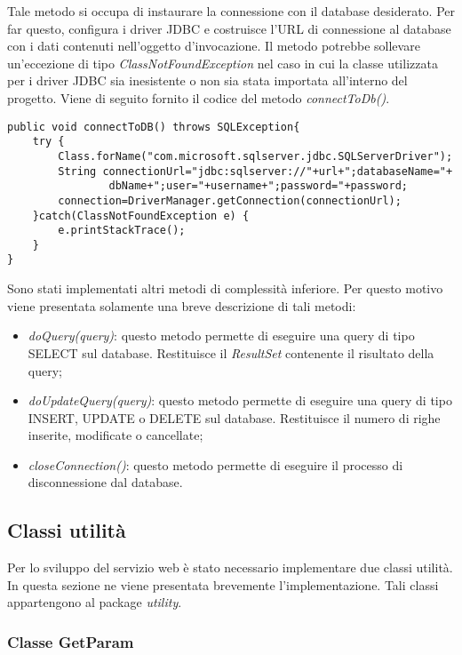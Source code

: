 Tale metodo si occupa di instaurare la connessione con il database desiderato. Per far questo, configura i driver JDBC e costruisce l'URL di connessione al database con i dati contenuti nell'oggetto d'invocazione. Il metodo potrebbe sollevare un'eccezione di tipo \textit{ClassNotFoundException} nel caso in cui la classe utilizzata per i driver JDBC sia inesistente o non sia stata importata all'interno del progetto. Viene di seguito fornito il codice del metodo \textit{connectToDb()}.
\begin{lstlisting}
public void connectToDB() throws SQLException{
	try {
		Class.forName("com.microsoft.sqlserver.jdbc.SQLServerDriver");
		String connectionUrl="jdbc:sqlserver://"+url+";databaseName="+
				dbName+";user="+username+";password="+password;
		connection=DriverManager.getConnection(connectionUrl);
	}catch(ClassNotFoundException e) {
		e.printStackTrace();
	}
}
\end{lstlisting}


Sono stati implementati altri metodi di complessità inferiore. Per questo motivo viene presentata solamente una breve descrizione di tali metodi:
\begin{itemize}
	\item \textit{doQuery(query)}: questo metodo permette di eseguire una query di tipo SELECT sul database. Restituisce il \textit{ResultSet} contenente il risultato della query;
	\item \textit{doUpdateQuery(query)}: questo metodo permette di eseguire una query di tipo INSERT, UPDATE o DELETE sul database. Restituisce il numero di righe inserite, modificate o cancellate;
	\item \textit{closeConnection()}: questo metodo permette di eseguire il processo di disconnessione dal database.
\end{itemize}

\subsection{Classi utilità}

Per lo sviluppo del servizio web è stato necessario implementare due classi utilità. In questa sezione ne viene presentata brevemente l'implementazione. Tali classi appartengono al package \textit{utility}.

\subsubsection{Classe GetParam}

